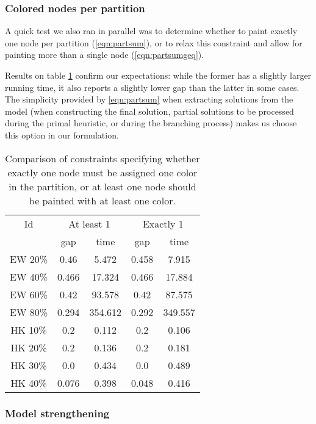 \subsubsection*{Colored nodes per partition}

A quick test we also ran in parallel was to determine whether to paint exactly one node per partition (\ref{eqn:partsum}), or to relax this constraint and allow for painting more than a single node (\ref{eqn:partsumgeq}). 

Results on table \ref{table:models:partsum} confirm our expectations: while the former has a slightly larger running time, it also reports a slightly lower gap than the latter in some cases. The simplicity provided by \ref{eqn:partsum} when extracting solutions from the model (when constructing the final solution, partial solutions to be processed during the primal heuristic, or during the branching process) makes us choose this option in our formulation.

\begin{table}
\label{table:models:partsum}
\centering

\begin{tabular}{|c|cc|cc|}
\hline
\multicolumn{1}{|c|}{Id} & \multicolumn{2}{|c|}{At least 1} & \multicolumn{2}{|c|}{Exactly 1}
\\
 & gap & time & gap & time
\\
\hline
EW 20\% & 0.46 & 5.472 & 0.458 & 7.915
\\
EW 40\% & 0.466 & 17.324 & 0.466 & 17.884
\\
EW 60\% & 0.42 & 93.578 & 0.42 & 87.575
\\
EW 80\% & 0.294 & 354.612 & 0.292 & 349.557
\\
\hline
HK 10\% &  0.2 & 0.112 &  0.2 & 0.106
\\
HK 20\% &  0.2 & 0.136 &  0.2 & 0.181
\\
HK 30\% &  0.0 & 0.434 &  0.0 & 0.489
\\
HK 40\% & 0.076 & 0.398 & 0.048 & 0.416
\\
\hline 
 \end{tabular}

\caption{Comparison of constraints specifying whether exactly one node must be assigned one color in the partition, or at least one node should be painted with at least one color.}

\end{table}

\subsubsection*{Model strengthening}

